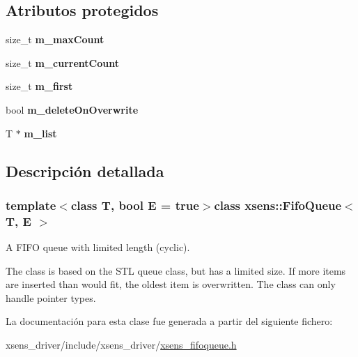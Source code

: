 \subsection*{\-Atributos protegidos}
\begin{DoxyCompactItemize}
\item 
\hypertarget{classxsens_1_1FifoQueue_a92c68d73af943dca929c9dbabe90042c}{size\-\_\-t {\bfseries m\-\_\-max\-Count}}\label{classxsens_1_1FifoQueue_a92c68d73af943dca929c9dbabe90042c}

\item 
\hypertarget{classxsens_1_1FifoQueue_ae333afd4993d7558116d3fcb42ed1143}{size\-\_\-t {\bfseries m\-\_\-current\-Count}}\label{classxsens_1_1FifoQueue_ae333afd4993d7558116d3fcb42ed1143}

\item 
\hypertarget{classxsens_1_1FifoQueue_ab28ce4c8eac78b214daf6ddb5d722af8}{size\-\_\-t {\bfseries m\-\_\-first}}\label{classxsens_1_1FifoQueue_ab28ce4c8eac78b214daf6ddb5d722af8}

\item 
\hypertarget{classxsens_1_1FifoQueue_a669d5fc4b869368e6de3452cccc7a422}{bool {\bfseries m\-\_\-delete\-On\-Overwrite}}\label{classxsens_1_1FifoQueue_a669d5fc4b869368e6de3452cccc7a422}

\item 
\hypertarget{classxsens_1_1FifoQueue_a254fc271e83f10761f8c219fd96b35f8}{\-T $\ast$ {\bfseries m\-\_\-list}}\label{classxsens_1_1FifoQueue_a254fc271e83f10761f8c219fd96b35f8}

\end{DoxyCompactItemize}


\subsection{\-Descripción detallada}
\subsubsection*{template$<$class \-T, bool \-E = true$>$class xsens\-::\-Fifo\-Queue$<$ T, E $>$}

\-A \-F\-I\-F\-O queue with limited length (cyclic). 

\-The class is based on the \-S\-T\-L queue class, but has a limited size. \-If more items are inserted than would fit, the oldest item is overwritten. \-The class can only handle pointer types. 

\-La documentación para esta clase fue generada a partir del siguiente fichero\-:\begin{DoxyCompactItemize}
\item 
xsens\-\_\-driver/include/xsens\-\_\-driver/\hyperlink{xsens__fifoqueue_8h}{xsens\-\_\-fifoqueue.\-h}\end{DoxyCompactItemize}
